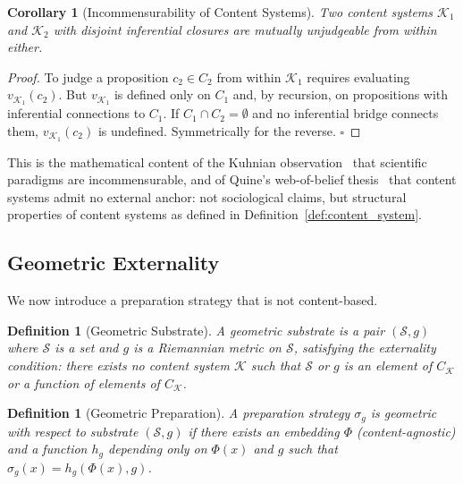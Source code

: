 \documentclass[11pt,twocolumn,a4paper]{article}
\newtheorem{corollary}[theorem]{Corollary}
\newtheorem{definition}[theorem]{Definition}
\begin{document}
\begin{corollary}[Incommensurability of Content Systems]
\label{cor:kuhn}
Two content systems $\mathcal{K}_1$ and $\mathcal{K}_2$ with disjoint inferential closures are mutually unjudgeable from within either.
\end{corollary}

\begin{proof}
To judge a proposition $c_2 \in C_2$ from within $\mathcal{K}_1$ requires evaluating $v_{\mathcal{K}_1}(c_2)$. But $v_{\mathcal{K}_1}$ is defined only on $C_1$ and, by recursion, on propositions with inferential connections to $C_1$. If $C_1 \cap C_2 = \emptyset$ and no inferential bridge connects them, $v_{\mathcal{K}_1}(c_2)$ is undefined. Symmetrically for the reverse. $\square$
\end{proof}

This is the mathematical content of the Kuhnian observation~\cite{kuhn1962structure} that scientific paradigms are incommensurable, and of Quine's web-of-belief thesis~\cite{quine1951two} that content systems admit no external anchor: not sociological claims, but structural properties of content systems as defined in Definition~\ref{def:content_system}.

\subsection{Geometric Externality}

We now introduce a preparation strategy that is not content-based.

\begin{definition}[Geometric Substrate]
\label{def:geometric_substrate}
A \emph{geometric substrate} is a pair $(\mathcal{S}, g)$ where $\mathcal{S}$ is a set and $g$ is a Riemannian metric on $\mathcal{S}$, satisfying the externality condition: there exists no content system $\mathcal{K}$ such that $\mathcal{S}$ or $g$ is an element of $C_\mathcal{K}$ or a function of elements of $C_\mathcal{K}$.
\end{definition}

\begin{definition}[Geometric Preparation]
\label{def:geometric_prep}
A preparation strategy $\sigma_g$ is \emph{geometric} with respect to substrate $(\mathcal{S}, g)$ if there exists an embedding $\Phi$ (content-agnostic) and a function $h_g$ depending only on $\Phi(x)$ and $g$ such that $\sigma_g(x) = h_g(\Phi(x), g)$.
\end{definition}
\end{document}
